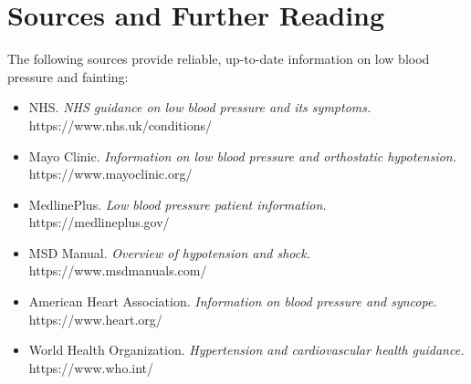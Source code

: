 \section*{Sources and Further Reading}
The following sources provide reliable, up-to-date information on low blood pressure and fainting:

\begin{itemize}
    \item NHS. \textit{NHS guidance on low blood pressure and its symptoms.} https://www.nhs.uk/conditions/
    \item Mayo Clinic. \textit{Information on low blood pressure and orthostatic hypotension.} https://www.mayoclinic.org/
    \item MedlinePlus. \textit{Low blood pressure patient information.} https://medlineplus.gov/
    \item MSD Manual. \textit{Overview of hypotension and shock.} https://www.msdmanuals.com/
    \item American Heart Association. \textit{Information on blood pressure and syncope.} https://www.heart.org/
    \item World Health Organization. \textit{Hypertension and cardiovascular health guidance.} https://www.who.int/
\end{itemize}
